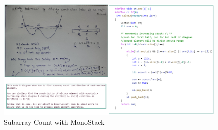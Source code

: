 \begin{fullwidth}
\begin{figure}[h]
    \caption{Subarray Count with MonoStack}
    \includegraphics[width=\dimexpr\textwidth+\marginparwidth\relax]{resources/monotonic-stack-subarray-count.jpg}
\end{figure}

\end{fullwidth}

\clearpage




